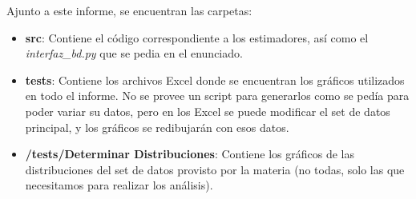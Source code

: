 	Ajunto a este informe, se encuentran las carpetas:
	
	\begin{itemize}
		\item \textbf{src}: Contiene el c\'odigo correspondiente a los estimadores, as\'i como el \textit{interfaz\_bd.py} que se pedia en el enunciado.
		\item \textbf{tests}: Contiene los archivos Excel donde se encuentran los gr\'aficos utilizados en todo el informe. No se provee un script para generarlos como se ped\'ia para poder variar su datos, pero en los Excel se puede modificar el set de datos principal, y los gr\'aficos se redibujar\'an con esos datos.
		\item \textbf{/tests/Determinar Distribuciones}: Contiene los gr\'aficos de las distribuciones del set de datos provisto por la materia (no todas, solo las que necesitamos para realizar los an\'alisis).
	\end{itemize}
		
